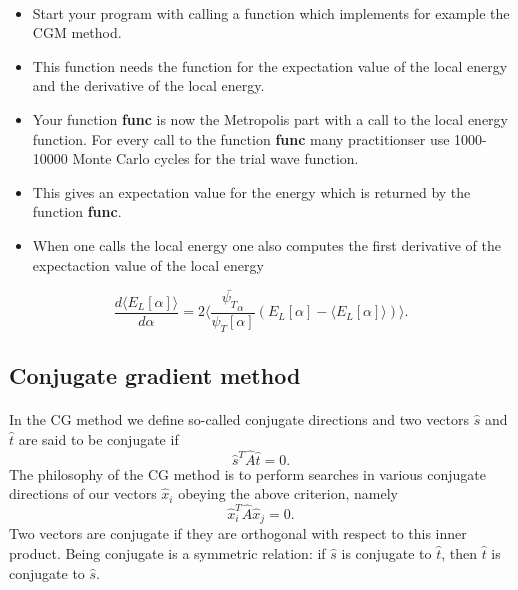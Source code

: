 \documentclass[%
twoside,                 %
final,                   %
10pt]{article}
\begin{document}
\paragraph{}
\begin{itemize}
  \item Start your program with calling a function which implements for example the  CGM method.

  \item This function needs the function for the expectation value of the local energy and the derivative of the local energy.

  \item Your function \textbf{func} is now the Metropolis part with a call to the local energy function. For every call to the function \textbf{func} many practitionser use 1000-10000 Monte Carlo cycles for the trial wave function.

  \item This gives an expectation value for the energy which is returned by the function \textbf{func}.

  \item When one calls the local energy one also computes the first derivative of the expectaction value of the local energy  
\end{itemize}

\noindent
\begin{equation*} \frac{d\langle E_{L}[\alpha] \rangle}{d\alpha}= 2\langle \frac{\bar{\psi_T}_{\alpha}}{\psi_T[\alpha]}\left(E_L[\alpha]-\langle  E_L[\alpha]\rangle\right)\rangle.
\end{equation*}





\subsection*{Conjugate gradient method}

\paragraph{}
In the CG method we define so-called conjugate directions and two vectors 
$\hat{s}$ and $\hat{t}$
are said to be
conjugate if
\begin{equation*}
\hat{s}^T\hat{A}\hat{t}= 0.
\end{equation*}
The philosophy of the CG method is to perform searches in various conjugate directions
of our vectors $\hat{x}_i$ obeying the above criterion, namely
\begin{equation*}
\hat{x}_i^T\hat{A}\hat{x}_j= 0.
\end{equation*}
Two vectors are conjugate if they are orthogonal with respect to 
this inner product. Being conjugate is a symmetric relation: if $\hat{s}$ is conjugate to $\hat{t}$, then $\hat{t}$ is conjugate to $\hat{s}$.
\end{document}
